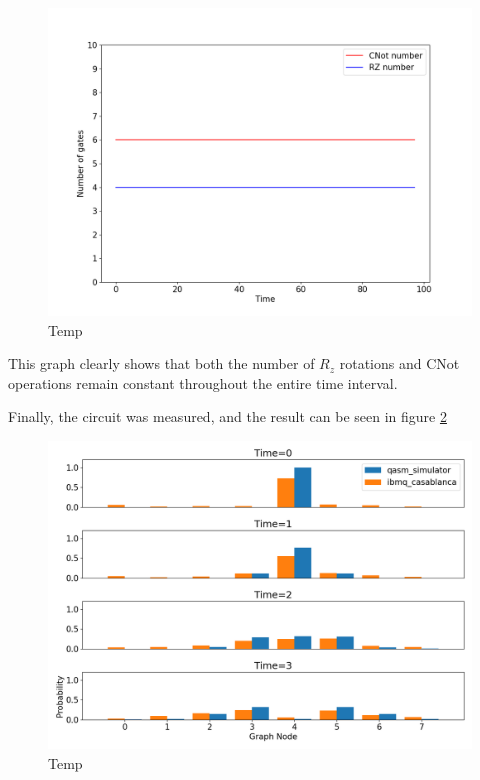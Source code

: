\documentclass[../../dissertation.tex]{subfiles}
\begin{document}
\begin{figure}[!h]
	\centering
	\includegraphics[scale=0.35]{img/Qiskit/ContQuantumWalk/gateCount_N3.png}
	\caption{Temp} 
	\label{fig:gateCountQiskit}
\end{figure}
This graph clearly shows that both the number of $R_z$ rotations and CNot operations remain constant throughout the entire time interval.\par
Finally, the circuit was measured, and the result can be seen in figure \ref{fig:contQWQiskitDist} 
\begin{figure}[!h]
	\centering
	\includegraphics[scale=0.35]{img/Qiskit/ContQuantumWalk/ContQW_N3_S0123.png}
	\caption{Temp} 
	\label{fig:contQWQiskitDist}
\end{figure}
\end{document}
